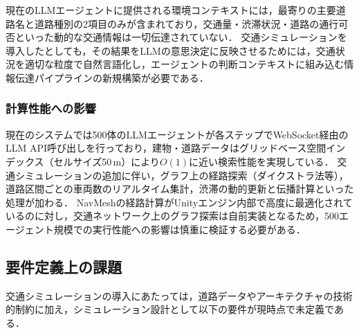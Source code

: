 \documentclass[a4paper,11pt]{jsarticle}
\begin{document}
現在のLLMエージェントに提供される環境コンテキストには，最寄りの主要道路名と道路種別の2項目のみが含まれており，交通量・渋滞状況・道路の通行可否といった動的な交通情報は一切伝達されていない．
交通シミュレーションを導入したとしても，その結果をLLMの意思決定に反映させるためには，交通状況を適切な粒度で自然言語化し，エージェントの判断コンテキストに組み込む情報伝達パイプラインの新規構築が必要である．

\subsubsection{計算性能への影響}

現在のシステムでは500体のLLMエージェントが各ステップでWebSocket経由のLLM API呼び出しを行っており，建物・道路データはグリッドベース空間インデックス（セルサイズ50\,m）により$O(1)$に近い検索性能を実現している．
交通シミュレーションの追加に伴い，グラフ上の経路探索（ダイクストラ法等），道路区間ごとの車両数のリアルタイム集計，渋滞の動的更新と伝播計算といった処理が加わる．
NavMeshの経路計算がUnityエンジン内部で高度に最適化されているのに対し，交通ネットワーク上のグラフ探索は自前実装となるため，500エージェント規模での実行性能への影響は慎重に検証する必要がある．

\subsection{要件定義上の課題}

交通シミュレーションの導入にあたっては，道路データやアーキテクチャの技術的制約に加え，シミュレーション設計として以下の要件が現時点で未定義である．
\end{document}
